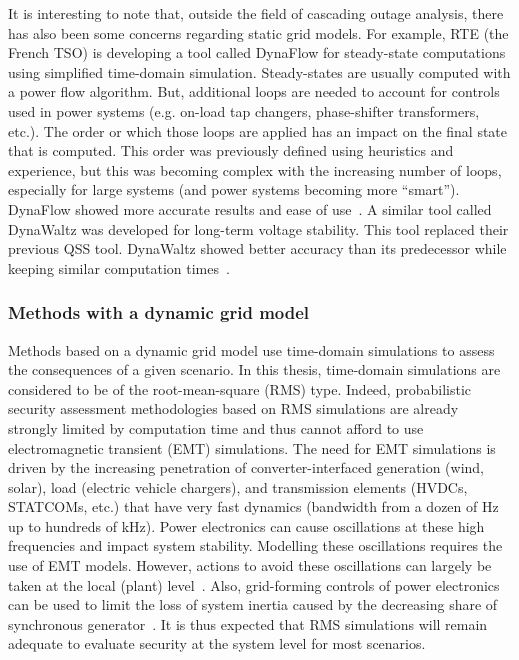 It is interesting to note that, outside the field of cascading outage analysis, there has also been some concerns regarding static grid models. For example, RTE (the French TSO) is developing a tool called DynaFlow for steady-state computations using simplified time-domain simulation. Steady-states are usually computed with a power flow algorithm. But, additional loops are needed to account for controls used in power systems (e.g. on-load tap changers, phase-shifter transformers, etc.). The order or which those loops are applied has an impact on the final state that is computed. This order was previously defined using heuristics and experience, but this was becoming complex with the increasing number of loops, especially for large systems (and power systems becoming more ``smart''). DynaFlow showed more accurate results and ease of use~\cite{DynaFlow}. A similar tool called DynaWaltz was developed for long-term voltage stability. This tool replaced their previous QSS tool. DynaWaltz showed better accuracy than its predecessor while keeping similar computation times~\cite{DynaWaltz}.



\subsubsection{Methods with a dynamic grid model}
\label{sec:DynMethods}

Methods based on a dynamic grid model use time-domain simulations to assess the consequences of a given scenario. In this thesis, time-domain simulations are considered to be of the root-mean-square (RMS) type. Indeed, probabilistic security assessment methodologies based on RMS simulations are already strongly limited by computation time and thus cannot afford to use electromagnetic transient (EMT) simulations. The need for EMT simulations is driven by the increasing penetration of converter-interfaced generation (wind, solar), load (electric vehicle chargers), and transmission elements (HVDCs, STATCOMs, etc.) that have very fast dynamics (bandwidth from a dozen of Hz up to hundreds of kHz). Power electronics can cause oscillations at these high frequencies and impact system stability. Modelling these oscillations requires the use of EMT models. However, actions to avoid these oscillations can largely be taken at the local (plant) level~\cite{AvoidEMT}. Also, grid-forming controls of power electronics can be used to limit the loss of system inertia caused by the decreasing share of synchronous generator~\cite{GridFormingAreTheyTheKey}. It is thus expected that RMS simulations will remain adequate to evaluate security at the system level for most scenarios.

